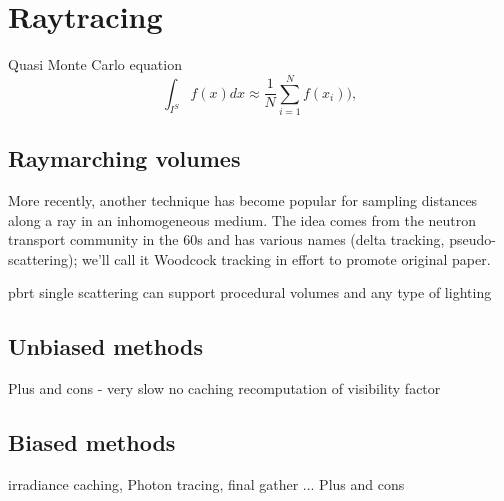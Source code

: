 \section{Raytracing}
Quasi Monte Carlo equation
\begin{equation*}
\int _{I^{S}}f(x)dx\approx\frac{1}{N}\sum_{i=1}^{N}f(x_{i})),
\end{equation*}
\subsection{Raymarching volumes}
More recently, another technique has become popular for sampling distances along a ray in an inhomogeneous medium. The idea comes from the neutron transport community in the 60s and has various names (delta tracking, pseudo-scattering); we’ll call it Woodcock tracking in effort to promote original paper.


pbrt single scattering
can support procedural volumes and any type of lighting
\subsection{Unbiased methods}
Plus and cons - very slow no caching recomputation of visibility factor
\subsection{Biased methods}
\cite{jarosz08thesis} %
irradiance caching, Photon tracing, final gather ...
Plus and cons

